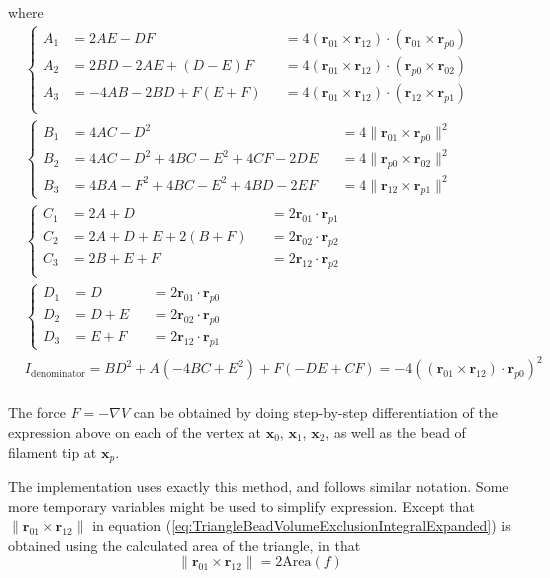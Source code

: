 \documentclass[main.tex]{subfiles}
\begin{document}
where
\begin{equation}
\begin{aligned}
&\left\{
\begin{aligned}
A_1 &= 2AE-DF &&= 4 (\bm{r}_{01}\times\bm{r}_{12}) \cdot (\bm{r}_{01}\times\bm{r}_{p0})\\
A_2 &= 2BD-2AE+(D-E)F &&= 4 (\bm{r}_{01}\times\bm{r}_{12}) \cdot (\bm{r}_{p0}\times\bm{r}_{02})\\
A_3 &= -4AB-2BD+F(E+F) &&= 4 (\bm{r}_{01}\times\bm{r}_{12}) \cdot (\bm{r}_{12}\times\bm{r}_{p1})\\
\end{aligned}
\right.\\
&\left\{
\begin{aligned}
B_1 &= 4AC-D^2 &&= 4 \|\bm{r}_{01}\times\bm{r}_{p0}\|^2\\
B_2 &= 4AC-D^2+4BC-E^2+4CF-2DE &&= 4 \|\bm{r}_{p0}\times\bm{r}_{02}\|^2\\
B_3 &= 4BA-F^2+4BC-E^2+4BD-2EF &&= 4 \|\bm{r}_{12}\times\bm{r}_{p1}\|^2
\end{aligned}
\right.\\
&\left\{
\begin{aligned}
C_1 &= 2A+D &&= 2\bm{r}_{01}\cdot\bm{r}_{p1}\\
C_2 &= 2A+D+E+2(B+F) &&= 2\bm{r}_{02}\cdot\bm{r}_{p2}\\
C_3 &= 2B+E+F &&= 2\bm{r}_{12}\cdot\bm{r}_{p2}\\
\end{aligned}
\right.\\
&\left\{
\begin{aligned}
D_1 &= D &&= 2\bm{r}_{01}\cdot\bm{r}_{p0}\\
D_2 &= D+E &&= 2\bm{r}_{02}\cdot\bm{r}_{p0}\\
D_3 &= E+F &&= 2\bm{r}_{12}\cdot\bm{r}_{p1}
\end{aligned}
\right.\\
&I_\text{denominator} = BD^2 + A(-4BC+E^2) + F(-DE+CF) = -4 \left( (\bm{r}_{01}\times\bm{r}_{12}) \cdot \bm{r}_{p0} \right)^2\\
\end{aligned}
\end{equation}

The force \( F = -\nabla V \) can be obtained by doing step-by-step differentiation of the expression above on each of the vertex at \(\bm{x}_0\), \(\bm{x}_1\), \(\bm{x}_2\), as well as the bead of filament tip at \(\bm{x}_p\).

The implementation uses exactly this method, and follows similar notation. Some more temporary variables might be used to simplify expression. Except that \(\|\bm{r}_{01}\times\bm{r}_{12}\|\) in equation (\ref{eq:TriangleBeadVolumeExclusionIntegralExpanded}) is obtained using the calculated area of the triangle, in that
\begin{equation}
\|\bm{r}_{01}\times\bm{r}_{12}\| = 2 \text{Area}(f)
\end{equation}
\end{document}
